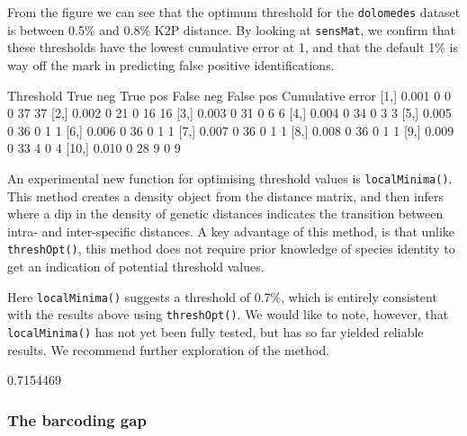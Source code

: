 \documentclass{article}
\newcommand{\fun}[1]{\texttt{#1}}
\begin{document}
From the figure we can see that the optimum threshold for the \fun{dolomedes} dataset is between 0.5\% and 0.8\% K2P distance. By looking at \fun{sensMat}, we confirm that these thresholds have the lowest cumulative error at 1, and that the default 1\% is way off the mark in predicting false positive identifications.

\begin{Routput}
      Threshold True neg True pos False neg False pos Cumulative error
 [1,]     0.001        0        0         0        37               37
 [2,]     0.002        0       21         0        16               16
 [3,]     0.003        0       31         0         6                6
 [4,]     0.004        0       34         0         3                3
 [5,]     0.005        0       36         0         1                1
 [6,]     0.006        0       36         0         1                1
 [7,]     0.007        0       36         0         1                1
 [8,]     0.008        0       36         0         1                1
 [9,]     0.009        0       33         4         0                4
[10,]     0.010        0       28         9         0                9
\end{Routput}

An experimental new function for optimising threshold values is \fun{localMinima()}. This method creates a density object from the distance matrix, and then infers where a dip in the density of genetic distances indicates the transition between intra- and inter-specific distances. A key advantage of this method, is that unlike \fun{threshOpt()}, this method does not require prior knowledge of species identity to get an indication of potential threshold values.

Here \fun{localMinima()} suggests a threshold of 0.7\%, which is entirely consistent with the results above using \fun{threshOpt()}. We would like to note, however, that \fun{localMinima()} has not yet been fully tested, but has so far yielded reliable results. We recommend further exploration of the method.


\begin{Routput}
[1] 0.7154469
\end{Routput}


\subsubsection{The barcoding gap}
\end{document}
